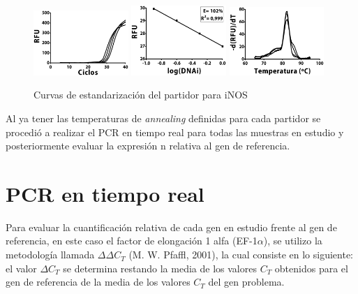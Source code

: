 \documentclass[12pt,letterpaper,oneside]{scrbook}
\begin{document}
\begin{figure}[h!]
\centering
        {\includegraphics[width=0.32\textwidth]{standarization/inos/ampl}}
        {\includegraphics[width=0.32\textwidth]{standarization/inos/stand}}
        {\includegraphics[width=0.32\textwidth]{standarization/inos/melting}}
        \caption{Curvas de estandarización del partidor para iNOS}
    \label {fig:inos}
\end{figure}

Al ya tener las temperaturas de \emph{annealing} definidas para cada
partidor se procedió a realizar el PCR en tiempo real para todas las
muestras en estudio y posteriormente evaluar la expresión n relativa al
gen de referencia.

\section{PCR en tiempo real}

Para evaluar la cuantificación relativa de cada gen en estudio frente al
gen de referencia, en este caso el factor de elongación 1 alfa
(EF-1\(\alpha\)), se utilizo la metodología llamada \(\Delta\Delta C_T\)
(M. W. Pfaffl, 2001), la cual consiste en lo siguiente: el valor
\(\Delta C_T\) se determina restando la media de los valores \(C_T\)
obtenidos para el gen de referencia de la media de los valores \(C_T\)
del gen problema.
\end{document}
